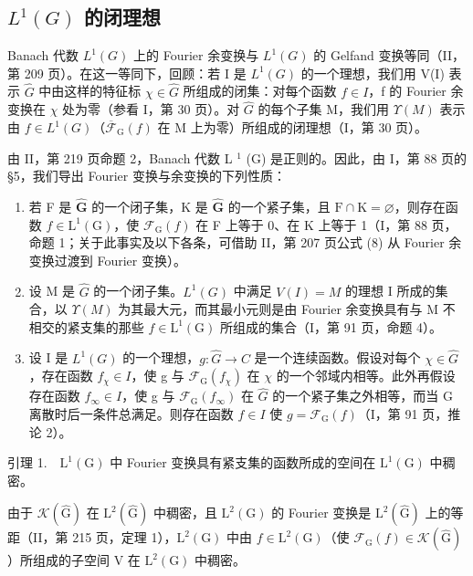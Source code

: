 \subsection{\texorpdfstring{\(L^{1}(G)\) 的闭理想}{L\^{}\{1\}(G) 的闭理想}}

Banach 代数 \(L^{1}(G)\) 上的 Fourier 余变换与 \(L^{1}(G)\) 的 Gelfand 变换等同（II，第 209 页）。在这一等同下，回顾：若 I 是 \(L^{1}(G)\) 的一个理想，我们用 V(I) 表示 \(\widehat{G}\) 中由这样的特征标 \(\chi \in \widehat{G}\) 所组成的闭集：对每个函数 \(f \in I\)，f 的 Fourier 余变换在 \(\chi\) 处为零（参看 I，第 30 页）。对 \(\widehat{G}\) 的每个子集 M，我们用 \(\Upsilon(M)\) 表示由 \(f \in L^{1}(G)\)（\(\overline{\mathcal{F}}_{\mathrm{G}}(f)\) 在 M 上为零）所组成的闭理想（I，第 30 页）。

由 II，第 219 页命题 2，Banach 代数 L \(^{1}\) (G) 是正则的。因此，由 I，第 88 页的 §5，我们导出 Fourier 变换与余变换的下列性质：

\begin{enumerate}
\def\labelenumi{\arabic{enumi})}
\item
  若 F 是 \(\widehat{\mathbf{G}}\) 的一个闭子集，K 是 \(\widehat{\mathbf{G}}\) 的一个紧子集，且 \(\mathrm{F} \cap \mathrm{K} = \varnothing\)，则存在函数 \(f \in \mathrm{L}^{1}(\mathrm{G})\)，使 \(\mathcal{F}_{\mathrm{G}}(f)\) 在 F 上等于 0、在 K 上等于 1（I，第 88 页，命题 1；关于此事实及以下各条，可借助 II，第 207 页公式 (8) 从 Fourier 余变换过渡到 Fourier 变换）。
\item
  设 M 是 \(\widehat{G}\) 的一个闭子集。\(L^{1}(G)\) 中满足 \(V(I) = M\) 的理想 I 所成的集合，以 \(\Upsilon(M)\) 为其最大元，而其最小元则是由 Fourier 余变换具有与 M 不相交的紧支集的那些 \(f \in \mathrm{L}^{1}(\mathrm{G})\) 所组成的集合（I，第 91 页，命题 4）。
\item
  设 I 是 \(L^{1}(G)\) 的一个理想，\(g\colon\widehat{G}\to C\) 是一个连续函数。假设对每个 \(\chi\in\widehat{G}\)，存在函数 \(f_{\chi}\in I\)，使 g 与 \(\mathcal{F}_{\mathrm{G}}(f_{\chi})\) 在 \(\chi\) 的一个邻域内相等。此外再假设存在函数 \(f_{\infty}\in I\)，使 g 与 \(\mathcal{F}_{\mathrm{G}}(f_{\infty})\) 在 \(\widehat{G}\) 的一个紧子集之外相等，而当 G 离散时后一条件总满足。则存在函数 \(f\in I\) 使 \(g=\mathcal{F}_{\mathrm{G}}(f)\)（I，第 91 页，推论 2）。
\end{enumerate}

引理 1.　\(\mathrm{L}^{1}(\mathrm{G})\) 中 Fourier 变换具有紧支集的函数所成的空间在 \(\mathrm{L}^{1}(\mathrm{G})\) 中稠密。

由于 \(\mathcal{K}(\widehat{\mathrm{G}})\) 在 \(\mathrm{L}^2 (\widehat{\mathrm{G}})\) 中稠密，且 \(\mathrm{L}^2 (\mathrm{G})\) 的 Fourier 变换是 \(\mathrm{L}^2 (\widehat{\mathrm{G}})\) 上的等距（II，第 215 页，定理 1），\(\mathrm{L}^2 (\mathrm{G})\) 中由 \(f\in \mathrm{L}^2 (\mathrm{G})\)（使 \(\mathcal{F}_{\mathrm{G}}(f)\in \mathcal{K}(\widehat{\mathrm{G}})\)）所组成的子空间 V 在 \(\mathrm{L}^2 (\mathrm{G})\) 中稠密。

